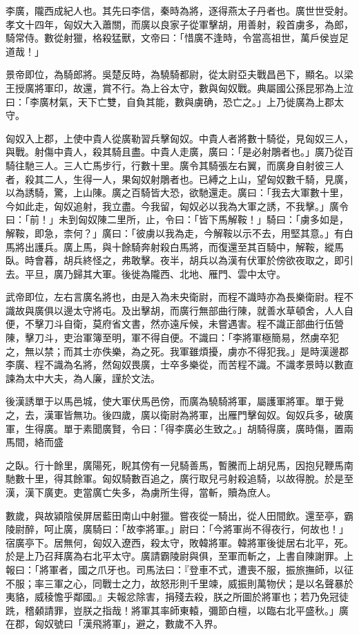 
\begin{pinyinscope}
李廣，隴西成紀人也。其先曰李信，秦時為將，逐得燕太子丹者也。廣世世受射。孝文十四年，匈奴大入蕭關，而廣以良家子從軍擊胡，用善射，殺首虜多，為郎，騎常侍。數從射獵，格殺猛獸，文帝曰：「惜廣不逢時，令當高祖世，萬戶侯豈足道哉！」

景帝即位，為騎郎將。吳楚反時，為驍騎都尉，從太尉亞夫戰昌邑下，顯名。以梁王授廣將軍印，故還，賞不行。為上谷太守，數與匈奴戰。典屬國公孫昆邪為上泣曰：「李廣材氣，天下亡雙，自負其能，數與虜确，恐亡之。」上乃徙廣為上郡太守。

匈奴入上郡，上使中貴人從廣勒習兵擊匈奴。中貴人者將數十騎從，見匈奴三人，與戰。射傷中貴人，殺其騎且盡。中貴人走廣，廣曰：「是必射鵰者也。」廣乃從百騎往馳三人。三人亡馬步行，行數十里。廣令其騎張左右翼，而廣身自射彼三人者，殺其二人，生得一人，果匈奴射鵰者也。已縛之上山，望匈奴數千騎，見廣，以為誘騎，驚，上山陳。廣之百騎皆大恐，欲馳還走。廣曰：「我去大軍數十里，今如此走，匈奴追射，我立盡。今我留，匈奴必以我為大軍之誘，不我擊。」廣令曰：「前！」未到匈奴陳二里所，止，令曰：「皆下馬解鞍！」騎曰：「虜多如是，解鞍，即急，柰何？」廣曰：「彼虜以我為走，今解鞍以示不去，用堅其意。」有白馬將出護兵。廣上馬，與十餘騎奔射殺白馬將，而復還至其百騎中，解鞍，縱馬臥。時會暮，胡兵終怪之，弗敢擊。夜半，胡兵以為漢有伏軍於傍欲夜取之，即引去。平旦，廣乃歸其大軍。後徙為隴西、北地、雁門、雲中太守。

武帝即位，左右言廣名將也，由是入為未央衛尉，而程不識時亦為長樂衛尉。程不識故與廣俱以邊太守將屯。及出擊胡，而廣行無部曲行陳，就善水草頓舍，人人自便，不擊刀斗自衛，莫府省文書，然亦遠斥候，未嘗遇害。程不識正部曲行伍營陳，擊刀斗，吏治軍簿至明，軍不得自便。不識曰：「李將軍極簡易，然虜卒犯之，無以禁；而其士亦佚樂，為之死。我軍雖煩擾，虜亦不得犯我。」是時漢邊郡李廣、程不識為名將，然匈奴畏廣，士卒多樂從，而苦程不識。不識孝景時以數直諫為太中大夫，為人廉，謹於文法。

後漢誘單于以馬邑城，使大軍伏馬邑傍，而廣為驍騎將軍，屬護軍將軍。單于覺之，去，漢軍皆無功。後四歲，廣以衛尉為將軍，出雁門擊匈奴。匈奴兵多，破廣軍，生得廣。單于素聞廣賢，令曰：「得李廣必生致之。」胡騎得廣，廣時傷，置兩馬間，絡而盛

之臥。行十餘里，廣陽死，睨其傍有一兒騎善馬，暫騰而上胡兒馬，因抱兒鞭馬南馳數十里，得其餘軍。匈奴騎數百追之，廣行取兒弓射殺追騎，以故得脫。於是至漢，漢下廣吏。吏當廣亡失多，為虜所生得，當斬，贖為庶人。

數歲，與故潁陰侯屏居藍田南山中射獵。嘗夜從一騎出，從人田間飲。還至亭，霸陵尉醉，呵止廣，廣騎曰：「故李將軍。」尉曰：「今將軍尚不得夜行，何故也！」宿廣亭下。居無何，匈奴入遼西，殺太守，敗韓將軍。韓將軍後徙居右北平，死。於是上乃召拜廣為右北平太守。廣請霸陵尉與俱，至軍而斬之，上書自陳謝罪。上報曰：「將軍者，國之爪牙也。司馬法曰：『登車不式，遭喪不服，振旅撫師，以征不服；率三軍之心，同戰士之力，故怒形則千里竦，威振則萬物伏；是以名聲暴於夷貉，威稜憺乎鄰國。』夫報忿除害，捐殘去殺，朕之所圖於將軍也；若乃免冠徒跣，稽顙請罪，豈朕之指哉！將軍其率師東轅，彌節白檀，以臨右北平盛秋。」廣在郡，匈奴號曰「漢飛將軍」，避之，數歲不入界。


\end{pinyinscope}
